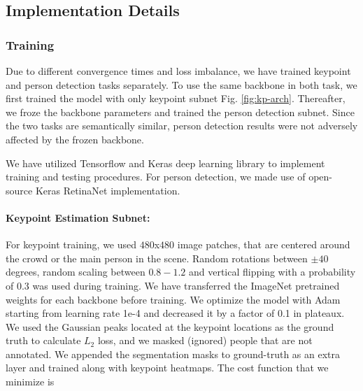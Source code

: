 \documentclass[runningheads]{llncs}
\begin{document}




\subsection{Implementation Details} 
\subsubsection{Training}
Due to different convergence times and loss imbalance, we have trained keypoint and person detection tasks separately. To use the same backbone in both task, we first trained the model with only keypoint subnet Fig. \ref{fig:kp-arch}. Thereafter, we froze the backbone parameters and trained the person detection subnet. Since the two tasks are semantically similar, person detection results were not adversely affected by the frozen backbone. 


We have utilized Tensorflow \cite{tensorflow2015-whitepaper} and Keras \cite{chollet2015keras} deep learning library to implement training and testing procedures. For person detection, we made use of open-source Keras RetinaNet\cite{hans_gaiser_2018_1188105} implementation.
\paragraph{Keypoint Estimation Subnet:} 
For keypoint training, we used $480$x$480$ image patches, that are centered around the crowd or the main person in the scene. Random rotations between $\pm 40$ degrees, random scaling between $0.8-1.2$ and vertical flipping with a probability of 0.3 was used during training. We have transferred the ImageNet \cite{imagenet} pretrained weights for each backbone before training. We optimize the model with Adam \cite{Kingma} starting from learning rate 1e-4 and decreased it by a factor of 0.1 in plateaux. We used the Gaussian peaks located at the keypoint locations as the ground truth to calculate $L_2$ loss, and we masked (ignored) people that are not annotated. We appended the segmentation masks to ground-truth as an extra layer and trained along with keypoint heatmaps. The cost function that we minimize is 
\end{document}
